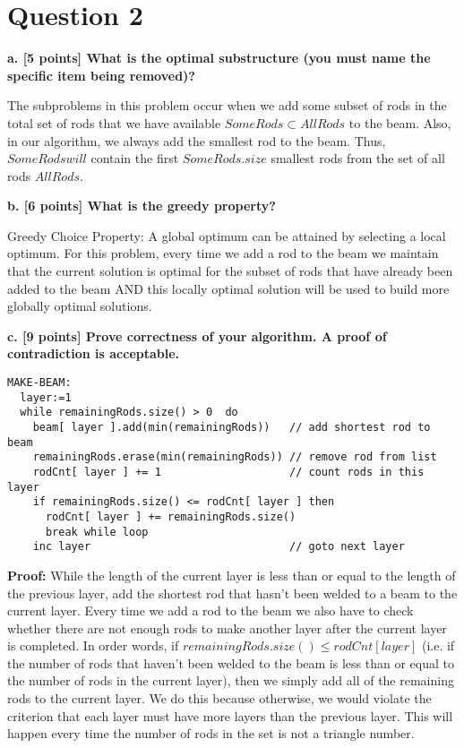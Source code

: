 \documentclass[12pt]{article}
\begin{document}
\section*{Question 2}
\textbf{a. [5 points] What is the optimal substructure (you must name the specific item being removed)?}

The subproblems in this problem occur when we add some subset of rods in the total set of rods that we have available $SomeRods \subset AllRods$ to the beam. Also, in our algorithm, we always add the smallest rod to the beam. Thus, $SomeRodswill$ contain the first $SomeRods.size$ smallest rods from the set of all rods $AllRods$. 

\noindent \textbf{b. [6 points] What is the greedy property? }

Greedy Choice Property: A global optimum can be attained by selecting a local optimum. For this problem, every time we add a rod to the beam we maintain that the current solution is optimal for the subset of rods that have already been added to the beam AND this locally optimal solution will be used to build more globally optimal solutions. 

\newpage
\noindent \textbf{c. [9 points] Prove correctness of your algorithm. A proof of contradiction is acceptable.}
\begin{lstlisting}[frame=single]
MAKE-BEAM:
  layer:=1                                                        
  while remainingRods.size() > 0  do 
    beam[ layer ].add(min(remainingRods))   // add shortest rod to beam
    remainingRods.erase(min(remainingRods)) // remove rod from list
    rodCnt[ layer ] += 1                    // count rods in this layer
    if remainingRods.size() <= rodCnt[ layer ] then
      rodCnt[ layer ] += remainingRods.size()
      break while loop 
    inc layer                               // goto next layer
\end{lstlisting}

\textbf{Proof: } While the length of the current layer is less than or
equal to the length of the previous layer, add the shortest rod that hasn't 
been welded to a beam to the current layer. 
Every time we add a rod to the beam we also have to check whether there 
are not enough rods to make another layer after the current layer is completed. 
In order words, if $ remainingRods.size() \le rodCnt[ layer ] $
(i.e. if the number of rods that haven't been welded to the beam is less than 
or equal to the number of rods in the current layer), 
then we simply add all of the 
remaining rods to the current layer. We do this because otherwise, we would 
violate the criterion that each layer must have more layers than the 
previous layer. 
This will happen every time the number of rods in the set is not a triangle 
number.
\end{document}
